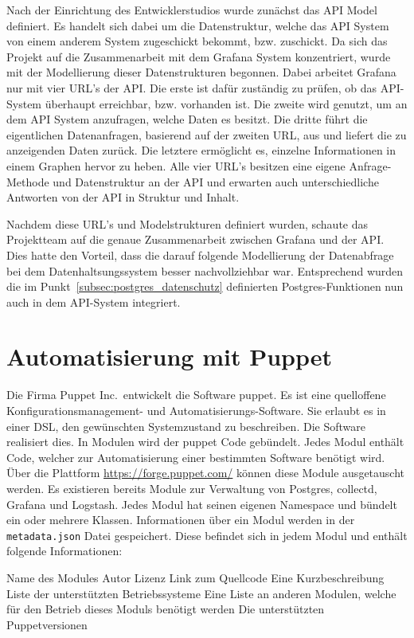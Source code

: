 Nach der Einrichtung des Entwicklerstudios wurde zunächst das API Model
definiert. Es handelt sich dabei um die Datenstruktur, welche das API System
von einem anderem System zugeschickt bekommt, bzw. zuschickt. Da sich das
Projekt auf die Zusammenarbeit mit dem Grafana System konzentriert, wurde
mit der Modellierung dieser Datenstrukturen begonnen. Dabei arbeitet Grafana
nur mit vier URL's der API. Die erste ist dafür zuständig zu prüfen, ob das
API-System überhaupt erreichbar, bzw. vorhanden ist. Die zweite wird genutzt,
um an dem API System anzufragen, welche Daten es besitzt. Die dritte führt die
eigentlichen Datenanfragen, basierend auf der zweiten URL, aus und liefert die
zu anzeigenden Daten zurück. Die letztere ermöglicht es, einzelne Informationen
in einem Graphen hervor zu heben. Alle vier URL's besitzen eine eigene
Anfrage-Methode und Datenstruktur an der API und erwarten auch unterschiedliche
Antworten von der API in Struktur und Inhalt.

Nachdem diese URL's und Modelstrukturen definiert wurden, schaute das
Projektteam auf die genaue Zusammenarbeit zwischen Grafana und der API. Dies
hatte den Vorteil, dass die darauf folgende Modellierung der Datenabfrage bei
dem Datenhaltsungssystem besser nachvollziehbar war. Entsprechend wurden die
im Punkt~\ref{subsec:postgres_datenschutz} definierten Postgres-Funktionen nun
auch in dem API-System integriert.
\nl%

\section{Automatisierung mit Puppet}
Die Firma Puppet Inc.\ entwickelt die Software puppet. Es ist eine quelloffene
Konfigurationsmanagement- und Automatisierungs-Software. Sie erlaubt es in
einer  \gls{DSL}, den
gewünschten Systemzustand zu beschreiben. Die Software realisiert dies. In
Modulen wird der puppet Code gebündelt. Jedes Modul enthält Code, welcher zur
Automatisierung einer bestimmten Software benötigt wird. Über die Plattform
\url{https://forge.puppet.com/} können diese Module ausgetauscht werden. Es
existieren bereits Module zur Verwaltung von Postgres, collectd, Grafana und
Logstash. Jedes Modul hat seinen eigenen \gls{Namespace} und bündelt ein oder
mehrere Klassen. Informationen über ein Modul werden in der
\texttt{metadata.json} Datei gespeichert. Diese befindet sich in jedem Modul
und enthält folgende Informationen:

\begin{outline}
  \1 Name des Modules
  \1 Autor
  \1 Lizenz
  \1 Link zum Quellcode
  \1 Eine Kurzbeschreibung
  \1 Liste der unterstützten Betriebssysteme
  \1 Eine Liste an anderen Modulen, welche für den Betrieb dieses Moduls
  benötigt werden
  \1 Die unterstützten Puppetversionen
\end{outline}
\tm%

